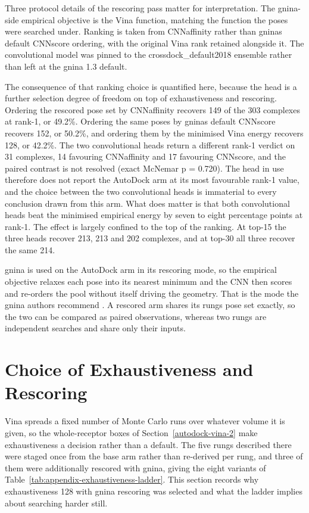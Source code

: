 Three protocol details of the rescoring pass matter for interpretation. The gnina-side empirical objective is the Vina function, matching the function the poses were searched under. Ranking is taken from CNNaffinity rather than gnina\textquotesingle s default CNNscore ordering, with the original Vina rank retained alongside it. The convolutional model was pinned to the crossdock\_default2018 ensemble rather than left at the gnina 1.3 default.

The consequence of that ranking choice is quantified here, because the head is a further selection degree of freedom on top of exhaustiveness and rescoring. Ordering the rescored pose set by CNNaffinity recovers 149 of the 303 complexes at rank-1, or 49.2\%. Ordering the same poses by gnina\textquotesingle s default CNNscore recovers 152, or 50.2\%, and ordering them by the minimised Vina energy recovers 128, or 42.2\%. The two convolutional heads return a different rank-1 verdict on 31 complexes, 14 favouring CNNaffinity and 17 favouring CNNscore, and the paired contrast is not resolved (exact McNemar p = 0.720). The head in use therefore does not report the AutoDock arm at its most favourable rank-1 value, and the choice between the two convolutional heads is immaterial to every conclusion drawn from this arm. What does matter is that both convolutional heads beat the minimised empirical energy by seven to eight percentage points at rank-1. The effect is largely confined to the top of the ranking. At top-15 the three heads recover 213, 213 and 202 complexes, and at top-30 all three recover the same 214.

gnina is used on the AutoDock arm in its rescoring mode, so the empirical objective relaxes each pose into its nearest minimum and the CNN then scores and re-orders the pool without itself driving the geometry. That is the mode the gnina authors recommend \cite{ref056}. A rescored arm shares its rung\textquotesingle s pose set exactly, so the two can be compared as paired observations, whereas two rungs are independent searches and share only their inputs.

\hypertarget{exhaustiveness-selection}{%
\section{Choice of Exhaustiveness and Rescoring}\label{exhaustiveness-selection}}

Vina spreads a fixed number of Monte Carlo runs over whatever volume it is given, so the whole-receptor boxes of Section~\ref{autodock-vina-2} make exhaustiveness a decision rather than a default. The five rungs described there were staged once from the base arm rather than re-derived per rung, and three of them were additionally rescored with gnina, giving the eight variants of Table~\ref{tab:appendix-exhaustiveness-ladder}. This section records why exhaustiveness 128 with gnina rescoring was selected and what the ladder implies about searching harder still.

